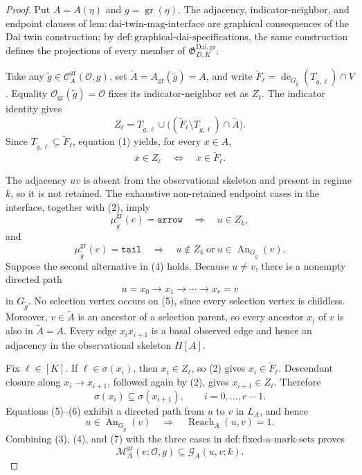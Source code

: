 \documentclass{article}
\begin{document}
\begin{proof}
Put \(A=A(\eta)\) and \(g=\operatorname{gr}(\eta)\).  The adjacency, indicator-neighbor, and endpoint clauses of \(\mathrm{lem:dai\mbox{-}twin\mbox{-}mag\mbox{-}interface}\) are graphical consequences of the Dai twin construction; by \(\mathrm{def:graphical\mbox{-}dai\mbox{-}specifications}\), the same construction defines the projections of every member of \(\mathfrak G_{D,K}^{\mathrm{Dai,gr}}\).

Take any \(\widetilde g\in\mathcal C_A^{\mathrm{gr}}(\mathcal O,g)\), set \(\widetilde A=A_{\mathrm{gr}}(\widetilde g)=A\), and write \(\widetilde F_\ell=\operatorname{de}_{G_{\widetilde g}}(T_{\widetilde g,\ell})\cap V\).  Equality \(\mathcal O_{\mathrm{gr}}(\widetilde g)=\mathcal O\) fixes its indicator-neighbor set as \(Z_\ell\).  The indicator identity gives
\[
 Z_\ell
 =T_{\widetilde g,\ell}\cup
 \bigl((\widetilde F_\ell\setminus T_{\widetilde g,\ell})
       \cap\widetilde A\bigr).
 \tag{1}
\]
Since \(T_{\widetilde g,\ell}\subseteq\widetilde F_\ell\), equation (1) yields, for every \(x\in A\),
\[
 x\in Z_\ell\quad\Longleftrightarrow\quad x\in\widetilde F_\ell.
 \tag{2}
\]

The adjacency \(uv\) is absent from the observational skeleton and present in regime \(k\), so it is not retained.  The exhaustive non-retained endpoint cases in the interface, together with (2), imply
\[
 \mu^{\mathrm{gr}}_{\widetilde g}(e)=\mathtt{arrow}
 \quad\Longrightarrow\quad u\in Z_k,
 \tag{3}
\]
and
\[
 \mu^{\mathrm{gr}}_{\widetilde g}(e)=\mathtt{tail}
 \quad\Longrightarrow\quad
 u\notin Z_k\ \text{or}\
 u\in\operatorname{An}_{G_{\widetilde g}}(v).
 \tag{4}
\]
Suppose the second alternative in (4) holds.  Because \(u\ne v\), there is a nonempty directed path
\[
 u=x_0\to x_1\to\cdots\to x_r=v
 \tag{5}
\]
in \(G_{\widetilde g}\).  No selection vertex occurs on (5), since every selection vertex is childless.  Moreover, \(v\in\widetilde A\) is an ancestor of a selection parent, so every ancestor \(x_i\) of \(v\) is also in \(\widetilde A=A\).  Every edge \(x_ix_{i+1}\) is a basal observed edge and hence an adjacency in the observational skeleton \(H[A]\).

Fix \(\ell\in[K]\).  If \(\ell\in\sigma(x_i)\), then \(x_i\in Z_\ell\), so (2) gives \(x_i\in\widetilde F_\ell\).  Descendant closure along \(x_i\to x_{i+1}\), followed again by (2), gives \(x_{i+1}\in Z_\ell\).  Therefore
\[
 \sigma(x_i)\subseteq\sigma(x_{i+1}),
 \qquad i=0,\ldots,r-1.
 \tag{6}
\]
Equations (5)--(6) exhibit a directed path from \(u\) to \(v\) in \(L_A\), and hence
\[
 u\in\operatorname{An}_{G_{\widetilde g}}(v)
 \quad\Longrightarrow\quad
 \operatorname{Reach}_A(u,v)=1.
 \tag{7}
\]
Combining (3), (4), and (7) with the three cases in \(\mathrm{def:fixed\mbox{-}a\mbox{-}mark\mbox{-}sets}\) proves
\[
 \mathcal M_A^{\mathrm{gr}}(e;\mathcal O,g)
 \subseteq\mathcal G_A(u,v;k).
 \tag{8}
\]


\end{proof}
\end{document}
